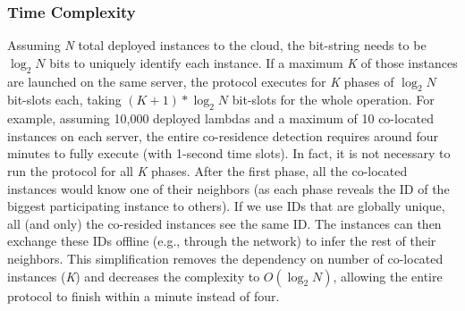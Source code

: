 \subsubsection{Time Complexity}
\label{sec:protocol:complexity}
Assuming \textit{N} total deployed instances to the cloud, the bit-string needs
to be $\log_2N$ bits to uniquely identify each instance. If a maximum \textit{K}
of those instances are launched on the same server, the protocol executes for
\textit{K} phases of $\log_2N$ bit-slots each, taking $(K+1)*\log_2N$ bit-slots
for the whole operation. For example, assuming 10,000 deployed lambdas and a maximum
of 10 co-located instances on each server, the entire  co-residence detection
requires around four minutes to fully execute (with 1-second time slots). In fact,
it is not necessary to run the protocol for all \textit{K} phases. After the
first phase, all the co-located instances would know one of their neighbors (as 
each phase reveals the ID of the biggest participating instance to others).
 If we use IDs that are 
globally unique, all (and only) the co-resided instances see the same ID. The instances can 
then exchange these IDs offline (e.g., through the network) to 
infer the rest of their neighbors. This simplification removes the dependency on 
number of co-located instances (\textit{K}) and decreases the complexity to $O(\log_2N)$, 
allowing the entire protocol to finish within a minute instead of four.



